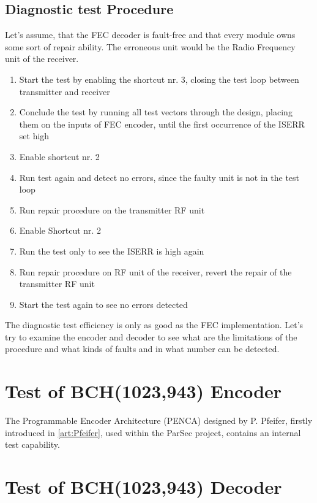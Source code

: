 \subsection{Diagnostic test Procedure}
Let's assume, that the FEC decoder is fault-free and that every module owns some sort of repair ability. The erroneous unit would be the Radio Frequency unit of the receiver.
\begin{enumerate}
    \item Start the test by enabling the shortcut nr. 3, closing the test loop between transmitter and receiver
    \item Conclude the test by running all test vectors through the design, placing them on the inputs of FEC encoder, until the first occurrence of the ISERR set high
    \item Enable shortcut nr. 2
    \item Run test again and detect no errors, since the faulty unit is not in the test loop
    \item Run repair procedure on the transmitter RF unit
    \item Enable Shortcut nr. 2
    \item Run the test only to see the ISERR is high again
    \item Run repair procedure on RF unit of the receiver, revert the repair of the transmitter RF unit
    \item Start the test again to see no errors detected
\end{enumerate}

The diagnostic test efficiency is only as good as the FEC implementation. Let's try to examine the encoder and decoder to see what are the limitations of the procedure and what kinds of faults and in what number can be detected.

\section{Test of BCH(1023,943) Encoder}
The Programmable Encoder Architecture (PENCA) designed by P. Pfeifer, firstly introduced in \ref{art:Pfeifer}, used within the ParSec project, contains an internal test capability. 
\section{Test of BCH(1023,943) Decoder}
